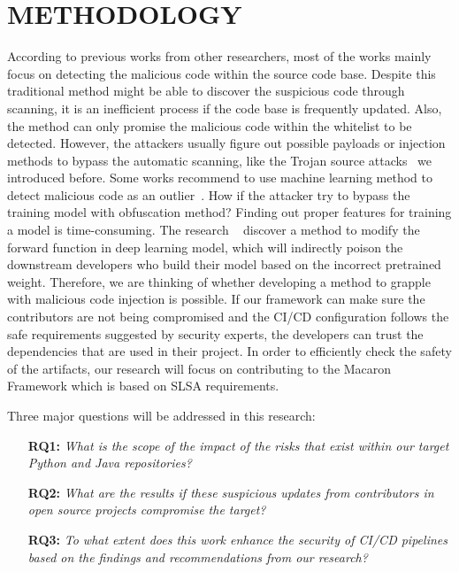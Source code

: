 \section{METHODOLOGY}
According to previous works from other researchers, most of the works mainly focus on detecting the malicious
code within the source code base. Despite this traditional method might be able to discover the suspicious 
code through scanning, it is an inefficient process if the code base is frequently updated. Also, the method 
can only promise the malicious code within the whitelist to be detected. However, the attackers usually 
figure out possible payloads or injection methods to bypass the automatic scanning, like the Trojan source 
attacks~\cite{boucher2023trojan} we introduced before. 
Some works recommend to use machine learning method to detect malicious code as an outlier~\cite{garrett2019detecting}.
How if the attacker try to bypass the training model with obfuscation method? Finding out proper features for
training a model is time-consuming. The research ~\cite{zheng2023careful} discover a method to modify
the forward function in deep learning model, which will indirectly poison the downstream developers who build 
their model based on the incorrect pretrained weight. 
Therefore, we are thinking of whether developing a method to grapple with malicious code injection is possible.
If our framework can make sure the contributors are not being compromised and the CI/CD configuration follows
the safe requirements suggested by security experts, the developers can trust the dependencies that are
used in their project. 
In order to efficiently check the safety of the artifacts, our research will focus on contributing to the Macaron
Framework which is based on SLSA requirements.

Three major questions will be addressed in this research:
\begin{enumerate}
    \item[{\textbf{RQ1:}}] \emph{What is the scope of the impact of the risks that exist within our target Python and Java repositories?}
    \item[{\textbf{RQ2:}}] \emph{What are the results if these suspicious updates from contributors in open source projects compromise the target?}
    \item[{\textbf{RQ3:}}] \emph{To what extent does this work enhance the security of CI/CD pipelines based on the findings and recommendations from our research?}
\end{enumerate}

